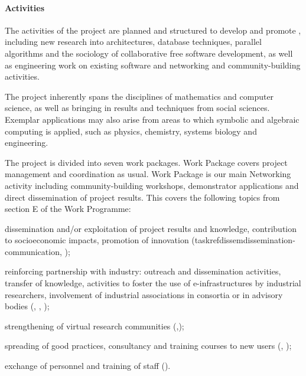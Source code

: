 \paragraph{Activities}

The activities of the project are planned and structured to develop
and promote \TheProject, including new research into
architectures, database techniques, parallel algorithms and the
sociology of collaborative free software development, as well as
engineering work on existing software and networking and
community-building activities.

The project inherently spans the disciplines of mathematics and
computer science, as well as bringing in results and techniques from
social sciences. Exemplar applications may also arise from areas to
which symbolic and algebraic computing is applied, such as physics,
chemistry, systems biology and engineering.


The project is divided into seven work packages. Work Package
 covers project management and coordination as
usual. Work Package  is our main Networking activity
including community-building workshops, demonstrator applications and
direct dissemination of project results.
This covers the following topics from section E of the Work Programme:
\begin{compactitem}
\item dissemination and/or exploitation of project results and
  knowledge, contribution to socioeconomic impacts, promotion of
  innovation (taskref{dissem}{dissemination-communication},
  );
\item reinforcing partnership with industry: outreach and
  dissemination activities, transfer of knowledge, activities to
  foster the use of e-infrastructures by industrial researchers,
  involvement of industrial associations in consortia or in advisory
  bodies (,
  , );
\item strengthening of virtual research communities
  (,);
\item spreading of good practices, consultancy and training courses to
  new users (,
  );
\item exchange of personnel and training of staff
  ().
\end{compactitem}



